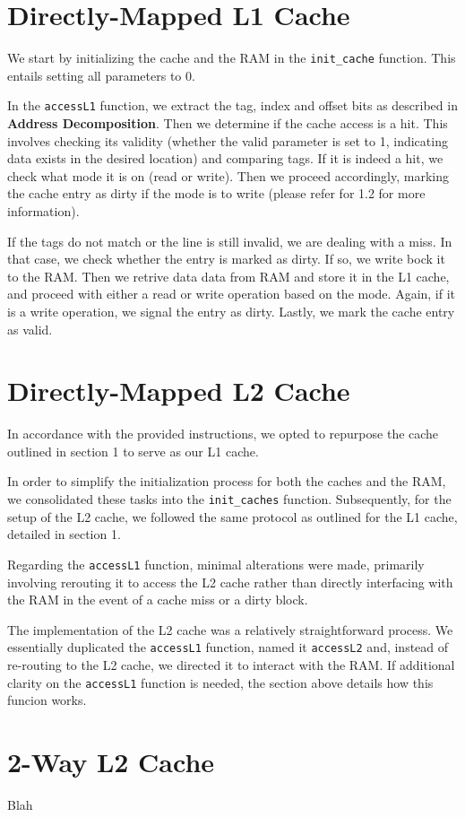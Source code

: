 \documentclass[12pt]{article}
\begin{document}
    \section{Directly-Mapped L1 Cache}\label{L1_cache}

    We start by initializing the cache and the RAM in the \texttt{init\_cache} function. This entails setting all parameters to 0.

    In the \texttt{accessL1} function, we extract the tag, index and offset bits as described in \textbf{Address Decomposition}. Then we determine if the cache access is a hit. This involves checking
    its validity (whether the valid parameter is set to 1, indicating data exists in the desired location) and comparing tags. If it is indeed a hit, we check what mode it is on (read or write). Then 
     we proceed accordingly, marking the cache entry as dirty if the mode is to write (please refer for 1.2 for more information).

    If the tags do not match or the line is still invalid, we are dealing with a miss. In that case, we check whether the entry is marked as dirty. If so, we write bock it to the RAM. Then we retrive data  
    data from RAM and store it in the L1 cache, and proceed with either a read or write operation based on the mode. Again, if it is a write operation, we signal the entry as dirty. Lastly, we mark the cache entry as valid.

    \section{Directly-Mapped L2 Cache}

    In accordance with the provided instructions, we opted to repurpose the cache outlined in section 1 to serve as our L1 cache.

    In order to simplify the initialization process for both the caches and the RAM, we consolidated these tasks into the \texttt{init\_caches} 
     function. Subsequently, for the setup of the L2 cache, we followed the same protocol as outlined for the L1 cache, detailed in section 1.

    Regarding the \texttt{accessL1} function, minimal alterations were made, primarily involving rerouting it to access the L2 cache rather than directly
     interfacing with the RAM in the event of a cache miss or a dirty block.

    The implementation of the L2 cache was a relatively straightforward process. We essentially duplicated the \texttt{accessL1} function, named it \texttt{accessL2} and,
     instead of re-routing to the L2 cache, we directed it to interact with the RAM. If additional clarity on the \texttt{accessL1} function is needed, the section above 
     details how this funcion works.


    \section{2-Way L2 Cache}

    Blah
\end{document}
